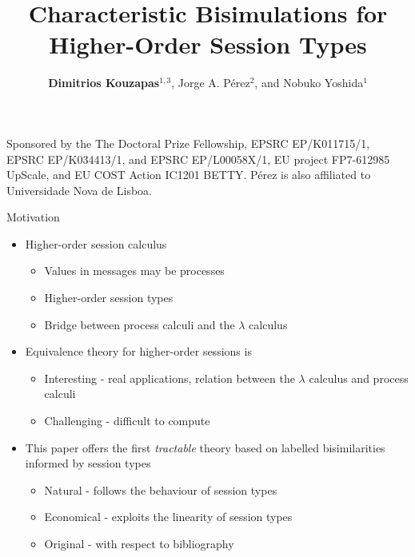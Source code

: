 \documentclass{beamer}
\title{Characteristic Bisimulations for Higher-Order Session Types}
\author{{\bf Dimitrios Kouzapas$^{1,3}$}, Jorge A. P\'{e}rez$^{2}$, and Nobuko Yoshida$^1$}
\institute{Imperial College London$^1$, University of Groningen$^2$, University of Glasgow$^3$}
\date
\begin{document}
	\begin{frame}
		\titlepage

		{ \tiny %
		Sponsored by the The Doctoral Prize Fellowship, EPSRC EP/K011715/1,
		EPSRC EP/K034413/1, and EPSRC EP/L00058X/1,
		EU project FP7-612985 UpScale, and EU COST Action IC1201 BETTY.  
		P\'{e}rez is  also affiliated to
		Universidade Nova de Lisboa.%
		}
	\end{frame}

	\begin{frame}{Motivation}
		\begin{itemize}
			\item	Higher-order session calculus

				\begin{itemize}
					\item	Values in messages may be processes
					\item	Higher-order session types
					\item	Bridge between process calculi and the $\lambda$ calculus
				\end{itemize}


			\item	Equivalence theory for higher-order sessions is
				\begin{itemize}
					\item	Interesting - real applications, relation between the $\lambda$ calculus and process calculi
					\item	Challenging - difficult to compute
				\end{itemize}

			\item	This paper offers the first {\em tractable} theory based on labelled bisimilarities
				informed by session types %
				\begin{itemize}
					\item	Natural - follows the behaviour of session types
					\item	Economical - exploits the linearity of session types
					\item	Original - with respect to bibliography
				\end{itemize}
		\end{itemize}
	\end{frame}
\end{document}
